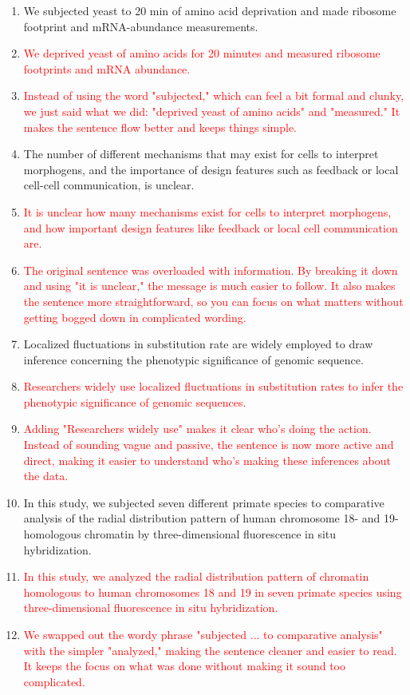 \documentclass{article}
\newcommand{\red}[1]{\textcolor{red}{#1}}
\begin{document}
\begin{enumerate}
        
    \item We subjected yeast to 20 min of amino acid deprivation and made ribosome footprint and mRNA-abundance measurements.
    \item[] \red{We deprived yeast of amino acids for 20 minutes and measured ribosome footprints and mRNA abundance.}
    \item[] \red{Instead of using the word "subjected," which can feel a bit formal and clunky, we just said what we did: "deprived yeast of amino acids" and "measured." It makes the sentence flow better and keeps things simple.}
    
    \item The number of different mechanisms that may exist for cells to interpret morphogens, and the importance of design features such as feedback or local cell-cell communication, is unclear.
    \item[] \red{It is unclear how many mechanisms exist for cells to interpret morphogens, and how important design features like feedback or local cell communication are.}
    \item[] \red{The original sentence was overloaded with information. By breaking it down and using "it is unclear," the message is much easier to follow. It also makes the sentence more straightforward, so you can focus on what matters without getting bogged down in complicated wording.}
     
    \item Localized fluctuations in substitution rate are widely employed to draw inference concerning the phenotypic significance of genomic sequence.
    \item[] \red{Researchers widely use localized fluctuations in substitution rates to infer the phenotypic significance of genomic sequences.}
    \item[] \red{Adding "Researchers widely use" makes it clear who’s doing the action. Instead of sounding vague and passive, the sentence is now more active and direct, making it easier to understand who’s making these inferences about the data.}
     
    \item In this study, we subjected seven different primate species to comparative analysis of the radial distribution pattern of human chromosome 18- and 19-homologous chromatin by three-dimensional fluorescence in situ hybridization.
    \item[] \red{In this study, we analyzed the radial distribution pattern of chromatin homologous to human chromosomes 18 and 19 in seven primate species using three-dimensional fluorescence in situ hybridization.}
    \item[] \red{We swapped out the wordy phrase "subjected ... to comparative analysis" with the simpler "analyzed," making the sentence cleaner and easier to read. It keeps the focus on what was done without making it sound too complicated.}
\end{enumerate}
\end{document}
